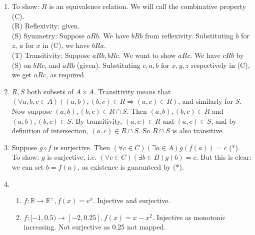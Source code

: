 \documentclass[10pt,a4paper]{article}
\begin{document}
\begin{enumerate}
    \item To show: \(R\) is an equivalence relation. We will call the combinative property (C).\\
    (R) Reflexivity: given. \\
    (S) Symmetry: Suppose \( a R b \). We have \(b R b\) from reflexivity.
    Substituting \(b\) for \(z\), \(a\) for \(x\) in (C), we have \(b R a\). \\
    (T) Transitivity: Suppose \( a R b, b R c \). We want to show \( a R c \).
    We have \(c R b\) by (S) on \(b R c\), and \(a R b\) (given).
    Substituting \(c, a, b\) for \(x, y, z\) respectively in (C), we get \(a R c\), as required.

    \item \(R, S\) both subsets of \(A \times A\).
    Transitivity means that \( (\forall a, b, c \in A) \left( (a,b), (b,c) \in R \Rightarrow (a, c) \in R \right) \),
    and similarly for \(S\).
    Now suppose \((a,b), (b,c) \in R \cap S\). Then \((a,b), (b,c) \in R\) and \((a,b), (b,c) \in S\).
    By transitivity, \((a, c) \in R\) and \((a, c) \in S\), and by definition of intersection, 
    \((a, c) \in R \cap S\). So \(R \cap S\) is also transitive.

    \item Suppose \( g \circ f \) is surjective.
    Then \( (\forall c \in C) (\exists a \in A) g(f(a)) = c \) (*). \\
    To show: \(g \) is surjective, i.e. \( (\forall c \in C) (\exists b \in B) g(b) = c \).
    But this is clear: we can set \( b = f(a) \), as existence is guaranteed by (*).
    
    \item 
    \begin{enumerate}
        \item \( f : \mathbb{R} \rightarrow \mathbb{R}^+, f(x) = e^x \). Injective and surjective.
        \item \( f : [-1, 0.5) \rightarrow [-2, 0.25], f(x) = x - x^2 \).
        Injective as monotonic increasing. Not surjective as 0.25 not mapped.
    \end{enumerate}


\end{enumerate}
\end{document}
